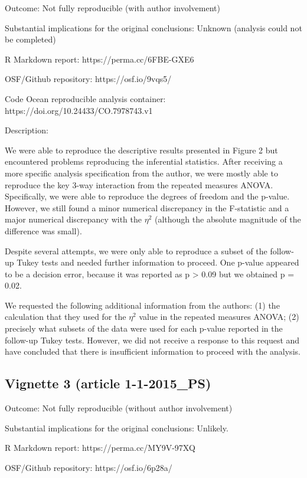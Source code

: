 \begin{appendix}
Outcome: Not fully reproducible (with author involvement)

Substantial implications for the original conclusions: Unknown (analysis
could not be completed)

R Markdown report: https://perma.cc/6FBE-GXE6

OSF/Github repository: https://osf.io/9vqs5/

Code Ocean reproducible analysis container:
https://doi.org/10.24433/CO.7978743.v1

Description:

We were able to reproduce the descriptive results presented in Figure 2
but encountered problems reproducing the inferential statistics. After
receiving a more specific analysis specification from the author, we
were mostly able to reproduce the key 3-way interaction from the
repeated measures ANOVA. Specifically, we were able to reproduce the
degrees of freedom and the p-value. However, we still found a minor
numerical discrepancy in the F-statistic and a major numerical
discrepancy with the \(\eta^2\) (although the absolute magnitude of the
difference was small).

Despite several attempts, we were only able to reproduce a subset of the
follow-up Tukey tests and needed further information to proceed. One
p-value appeared to be a decision error, because it was reported as p
\textgreater{} 0.09 but we obtained p = 0.02.

We requested the following additional information from the authors: (1)
the calculation that they used for the \(\eta^2\) value in the repeated
measures ANOVA; (2) precisely what subsets of the data were used for
each p-value reported in the follow-up Tukey tests. However, we did not
receive a response to this request and have concluded that there is
insufficient information to proceed with the analysis.

\hypertarget{vignette-3-article-1-1-2015_ps}{%
\subsection{Vignette 3 (article
1-1-2015\_PS)}\label{vignette-3-article-1-1-2015_ps}}

Outcome: Not fully reproducible (without author involvement)

Substantial implications for the original conclusions: Unlikely.

R Markdown report: https://perma.cc/MY9V-97XQ

OSF/Github repository: https://osf.io/6p28a/


\end{appendix}
